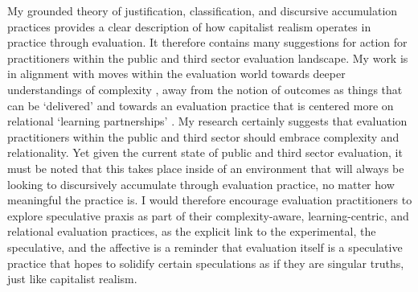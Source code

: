 My grounded theory of justification, classification, and discursive accumulation practices provides a clear description of how capitalist realism operates in practice through evaluation. It therefore contains many suggestions for action for practitioners within the public and third sector evaluation landscape. My work is in alignment with moves within the evaluation world towards deeper understandings of complexity \citep{douthwaite_towards_2017}, away from the notion of outcomes as things that can be `delivered' \citep[p. 983]{lowe_playing_2017}  and towards an evaluation practice that is centered more on relational `learning partnerships' \citep{hesselgreaves_new_2021}. My research certainly suggests that evaluation practitioners within the public and third sector should embrace complexity and relationality. Yet given the current state of public and third sector evaluation, it must be noted that this takes place inside of an environment that will always be looking to discursively accumulate through evaluation practice, no matter how meaningful the practice is. I would therefore encourage evaluation practitioners to explore speculative praxis as part of their complexity-aware, learning-centric, and relational evaluation practices, as the explicit link to the experimental, the speculative, and the affective is a reminder that evaluation itself is a speculative practice that hopes to solidify certain speculations as if they are singular truths, just like capitalist realism.

